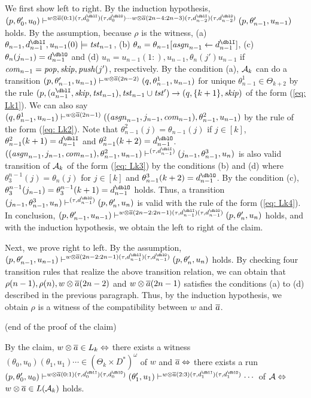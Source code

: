 We first show left to right.
By the induction hypothesis,
$(p,\theta'_0,u_0)\vdash^{w\otimes\overa(0:1)(\tau,d^\dblI_{0})(\tau,d^\dblO_{0})\cdots w\otimes\overa(2n-4:2n-3)(\tau,d^\dblI_{n-2})(\tau,d^\dblO_{n-2})}(p,\theta'_{n-1},u_{n-1})$ holds.
By the assumption, because $\rho$ is the witness,
(a) $\theta_{n-1}, d^\dblI_{n-1}, u_{n-1}(0) \models \tst_{n-1}$,
(b) $\theta_{n}=\theta_{n-1}[\asgn_{n-1}\leftarrow d^\dblI_{n-1}]$,
(c) $\theta_{n}(j_{n-1}) = d^\dblO_{n-1}$ and
(d) $u_{n}={u_{n-1}(1:)}, u_{n-1}, \theta_{n}(j')u_{n-1}$
if $\mathit{com}_{n-1}=\mathit{pop},\mathit{skip},\mathit{push}(j')$, respectively.
By the condition (a),
${\cal A}_k$ can do a transition
$(p,\theta'_{n-1},u_{n-1})\vdash^{w\otimes{\overline{a}}(2n-2)}
(q,\theta^1_{n-1},u_{n-1})$ for unique $\theta^1_{n-1}\in\Theta_{k+2}$ by the rule $(p, (a^\dblI_{n-1}, \skip, \tst_{n-1}), \tst_{n-1}\cup\tst') \to (q, \{k+1\}, \skip)$ of the form (\ref{eq: Lk1}).
We can also say
$(q,\theta^1_{n-1},u_{n-1})\vdash^{w\otimes{\overline{a}}(2n-1)}
((\mathit{asgn}_{n-1}, j_{n-1}, \mathit{com}_{n-1}),\theta^2_{n-1},u_{n-1})$ by the rule of the form (\ref{eq: Lk2}). Note that $\theta^2_{n-1}(j)=\theta_{n-1}(j)$ if $j\in[k]$, $\theta^2_{n-1}(k+1)=d^\dblI_{n-1}$ and
$\theta^2_{n-1}(k+2)=d^\dblO_{n-1}$.
$((\asgn_{n-1}, j_{n-1}, \com_{n-1}),\theta^2_{n-1},u_{n-1})\vdash^{(\tau,d^\dblI_{n-1})}(j_{n-1},\theta^3_{n-1},u_{n})$ is also valid transition of ${\cal A}_k$ of the form (\ref{eq: Lk3}) by the conditions (b) and (d)
where $\theta_3^{n-1}(j)=\theta_{n}(j)$
for $j\in[k]$ and $\theta^3_{n-1}(k+2)=d^\dblO_{n-1}$.
By the condition (c), $\theta_3^{n-1}(j_{n-1})=\theta_3^{n-1}(k+1)=d^\dblO_{n-1}$ holds.
Thus, a transition $(j_{n-1},\theta^3_{n-1},u_{n})\vdash^{(\tau,d^\dblO_{n-1})}(p,\theta'_{n},u_{n})$ is valid with the rule of the form (\ref{eq: Lk4}).
In conclusion,
$(p,\theta'_{n-1},u_{n-1})\vdash^ {w\otimes\overa(2n-2:2n-1)(\tau,d^\dblI_{n-1})(\tau,d^\dblO_{n-1})}(p,\theta'_{n},u_{n})$
holds, and with the induction hypothesis, we obtain the left to right of the claim.

Next, we prove right to left. By the assumption,
$(p,\theta'_{n-1},u_{n-1})\vdash^ {w\otimes\overa(2n-2:2n-1)(\tau,d^\dblI_{n-1})(\tau,d^\dblO_{n-1})}(p,\theta'_{n},u_{n})$
holds. By checking four transition rules that realize the above transition relation, we can obtain that $\rho(n-1), \rho(n), w\otimes{\overline{a}}(2n-2)$ and $w\otimes{\overline{a}}(2n-1)$ satisfies the conditions (a) to (d) described in the previous paragraph. Thus, by the induction hypothesis,
we obtain $\rho$ is a witness of the compatibility between $w$ and ${\overline{a}}$.
\par\medskip\noindent
\begin{flushright}
(end of the proof of the claim)
\end{flushright}
\par\medskip\noindent
By the claim,
$w\otimes{\overline{a}} \in L_k\Leftrightarrow$
there exists a witness $(\theta_0,u_0)(\theta_1, u_1)\cdots\in (\Theta_k\times D^*)^\omega$ of $w$ and ${\overline{a}}\Leftrightarrow$
there exists a run
$(p,\theta'_0,u_0)\vdash^{w\otimes\overa(0:1)(\tau,d^\dblI_{0})(\tau,d^\dblO_{0})}(\theta'_1,u_1)\vdash^{w\otimes\overa(2:3)(\tau,d^\dblI_{1})(\tau,d^\dblO_{1})}\cdots$ of ${\cal A}\Leftrightarrow$
$w\otimes{\overline{a}} \in L({\cal A}_k)$ holds.

